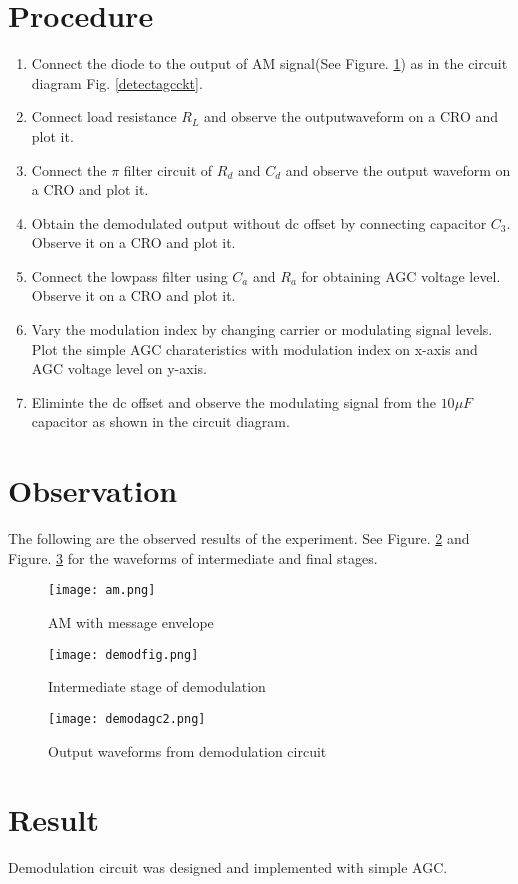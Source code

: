 \section*{Procedure}
\begin{enumerate}
\item
Connect the diode to the output of AM signal(See Figure. \ref{amenv}) as in the circuit diagram Fig. \ref{detectagcckt}.
\item
Connect load resistance $R_L$ and observe the outputwaveform on a CRO and plot it.
\item
Connect the $\pi$ filter circuit of $R_d$ and $C_d$ and observe the output waveform on a CRO and plot it.
\item
Obtain the demodulated output without dc offset by connecting capacitor $C_3$. Observe it on a CRO and plot it.
\item
Connect the lowpass filter using $C_a$ and $R_a$ for obtaining AGC voltage level. Observe it on a CRO and plot it.
\item Vary the modulation index by changing carrier or modulating signal levels. Plot the simple AGC charateristics with modulation index on x-axis and AGC voltage level on y-axis.
\item
Eliminte the dc offset and observe the modulating signal from the $10\mu F$ capacitor as shown in the circuit diagram.
\end{enumerate}
\section*{Observation}
The following are the observed results of the experiment. See Figure. \ref{aminter} and Figure. \ref{demodagcwaves} for the waveforms of intermediate and final stages.
\begin{figure}
\texttt{[image: am.png]}
\caption{AM with message envelope}
\label{amenv}
\end{figure}
\begin{figure}
\texttt{[image: demodfig.png]}
\caption{Intermediate stage of demodulation}
\label{aminter}

\end{figure}
\begin{figure}
\texttt{[image: demodagc2.png]}
\caption{Output waveforms from demodulation circuit}
\label{demodagcwaves}
\end{figure}

\section*{Result}

Demodulation circuit was designed and implemented with simple AGC.
